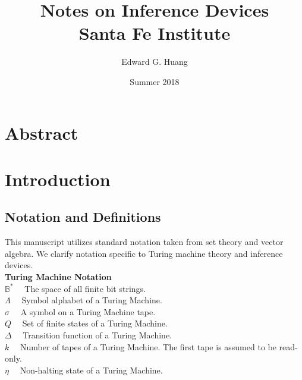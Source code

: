 \documentclass[11pt]{article}
\title{
  Notes on Inference Devices \\
  \large Santa Fe Institute}
\author{Edward G. Huang}
\date{Summer 2018}
\newcommand{\B}{\mathbb{B}}
\begin{document}
\maketitle 


\section{Abstract} 

 

\section{Introduction} 


\subsection{Notation and Definitions}
This manuscript utilizes standard notation taken from set theory and vector algebra. We clarify notation specific to Turing machine theory and inference devices. \\

\textbf{Turing Machine Notation} \\
$ \B^{*} \quad $ The space of all finite bit strings. \\
$ \Lambda \quad $ Symbol alphabet of a Turing Machine. \\
$ \sigma \quad $ A symbol on a Turing Machine tape. \\
$ Q \quad $ Set of finite states of a Turing Machine. \\
$ \Delta \quad $ Transition function of a Turing Machine. \\
$ k \quad $ Number of tapes of a Turing Machine. The first tape is assumed to be read-only. \\
$ \eta \quad $ Non-halting state of a Turing Machine. \\
\end{document}
